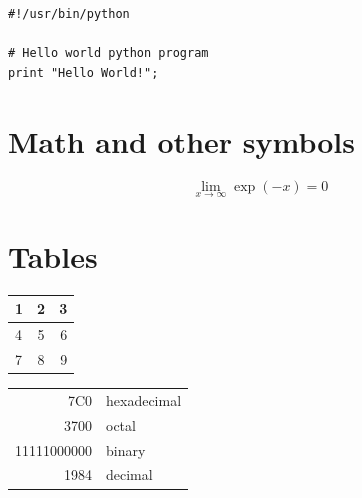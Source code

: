 \documentclass[11pt,a4paper,twoside]{article}
\begin{document}
\begin{lstlisting}[frame=single]
#!/usr/bin/python

# Hello world python program
print "Hello World!";
\end{lstlisting}


\section{Math and other symbols}

$$ \lim_{x \to \infty} \exp(-x) = 0 $$

\section{Tables}

\begin{center}
  \begin{tabular}{ l | c || r }
    \hline
    1 & 2 & 3 \\ \hline
    4 & 5 & 6 \\ \hline
    7 & 8 & 9 \\
    \hline
  \end{tabular}
\end{center}

\begin{tabular}{|r|l|}
  \hline
  7C0 & hexadecimal \\
  3700 & octal \\ \cline{2-2}
  11111000000 & binary \\
  \hline \hline
  1984 & decimal \\
  \hline
\end{tabular}
\end{document}
